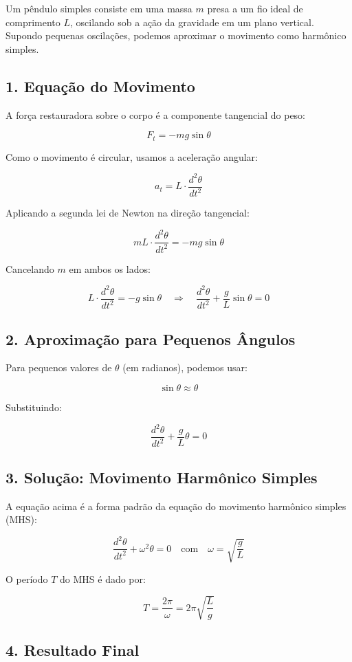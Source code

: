 \documentclass[a4paper,12pt]{article}
\begin{document}
Um pêndulo simples consiste em uma massa \( m \) presa a um fio ideal de comprimento \( L \), oscilando sob a ação da gravidade em um plano vertical. Supondo pequenas oscilações, podemos aproximar o movimento como harmônico simples.

\subsection*{1. Equação do Movimento}

A força restauradora sobre o corpo é a componente tangencial do peso:

\[
F_t = -mg \sin\theta
\]

Como o movimento é circular, usamos a aceleração angular:

\[
a_t = L \cdot \frac{d^2\theta}{dt^2}
\]

Aplicando a segunda lei de Newton na direção tangencial:

\[
mL \cdot \frac{d^2\theta}{dt^2} = -mg \sin\theta
\]

Cancelando \( m \) em ambos os lados:

\[
L \cdot \frac{d^2\theta}{dt^2} = -g \sin\theta
\quad \Rightarrow \quad
\frac{d^2\theta}{dt^2} + \frac{g}{L} \sin\theta = 0
\]

\subsection*{2. Aproximação para Pequenos Ângulos}

Para pequenos valores de \( \theta \) (em radianos), podemos usar:

\[
\sin\theta \approx \theta
\]

Substituindo:

\[
\frac{d^2\theta}{dt^2} + \frac{g}{L} \theta = 0
\]

\subsection*{3. Solução: Movimento Harmônico Simples}

A equação acima é a forma padrão da equação do movimento harmônico simples (MHS):

\[
\frac{d^2\theta}{dt^2} + \omega^2 \theta = 0
\quad \text{com} \quad \omega = \sqrt{\frac{g}{L}}
\]

O período \( T \) do MHS é dado por:

\[
T = \frac{2\pi}{\omega} = 2\pi \sqrt{\frac{L}{g}}
\]

\subsection*{4. Resultado Final}
\end{document}
